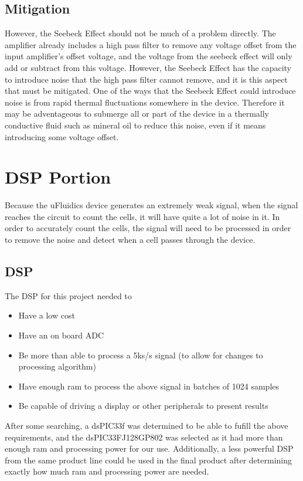 \documentclass[10pt, journal]{IEEEtran}
\begin{document}
\subsection{Mitigation}
However, the Seebeck Effect should not be much of a problem
directly. The amplifier already includes a high pass filter to remove
any voltage offset from the input amplifier's offset voltage, and the
voltage from the seebeck effect will only add or subtract from this
voltage. However, the Seebeck Effect has the capacity to introduce
noise that the high pass filter cannot remove, and it is this aspect
that must be mitigated. One of the ways that the Seebeck Effect could
introduce noise is from rapid thermal fluctuations somewhere in the
device. Therefore it may be adventageous to submerge all or part of
the device in a thermally conductive fluid such as mineral oil to
reduce this noise, even if it means introducing some voltage offset.

\section{DSP Portion}
Because the uFluidics device generates an extremely weak signal, when
the signal reaches the circuit to count the cells, it will have quite
a lot of noise in it. In order to accurately count the cells, the
signal will need to be processed in order to remove the noise and
detect when a cell passes through the device.

\subsection{DSP}
The DSP for this project needed to 
\begin{itemize}
\item Have a low cost
\item Have an on board ADC
\item Be more than able to process a 5ks/s signal (to allow for changes to processing algorithm)
\item Have enough ram to process the above signal in batches of 1024 samples
\item Be capable of driving a display or other peripherals to present results
\end{itemize}

After some searching, a dsPIC33f was determined to be able to fufill
the above requirements, and the dsPIC33FJ128GP802 was selected as it
had more than enough ram and processing power for our
use. Additionally, a less powerful DSP from the same product line
could be used in the final product after determining exactly how much
ram and processing power are needed.
\end{document}
